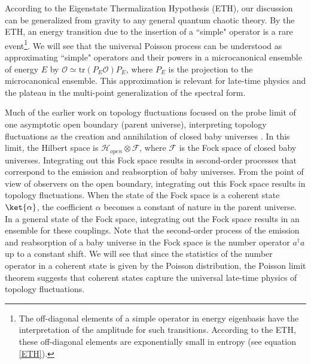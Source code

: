 \documentclass[a4paper,11pt]{article}
\theoremstyle{definition}
\numberwithin{equation}{section}
\newcommand{\mF}{\mathcal{F}}
\newcommand{\NL}[1]{\textcolor{blue}{#1}}
\newcommand{\mO}{\mathcal{O}}
\begin{document}
According to the Eigenstate Thermalization Hypothesis (ETH), our discussion can be generalized from gravity to any general quantum chaotic theory. By the ETH, an energy transition due to the insertion of a ``simple" operator is a rare event\footnote{The off-diagonal elements of a simple operator in energy eigenbasis have the interpretation of the amplitude for such transitions. According to the ETH, these off-diagonal elements are exponentially small in entropy (see equation \ref{ETH}).}. We will see that the universal Poisson process can be understood as approximating ``simple" operators and their powers in a microcanonical ensemble of energy $E$ by $\mO\simeq \text{tr}(P_E\mO) P_E$, where $P_E$ is the projection to the microcanonical ensemble. This approximation is relevant for late-time physics and the plateau in the multi-point generalization of the spectral form. 


Much of the earlier work on topology fluctuations focused on the probe limit of one asymptotic open boundary (parent universe), interpreting topology fluctuations as the creation and annihilation of closed baby universes \cite{giddings1988axion,giddings1988loss,coleman1988black}. In this limit,  the Hilbert space is $\mathcal{H}_{open}\otimes \mF$, where $\mF$ is the Fock space of closed baby universes. Integrating out this Fock space results in second-order processes that correspond to the emission and reabsorption of baby universes. From the point of view of observers on the open boundary, integrating out this Fock space results in topology fluctuations. When the state of the Fock space is a coherent state $\ket{\alpha}$, the coefficient $\alpha$ becomes a constant of nature in the parent universe. In a general state of the Fock space, integrating out the Fock space results in an ensemble for these couplings. Note that the second-order process of the emission and reabsorption of a baby universe in the Fock space is the number operator $a^\dagger a$ up to a constant shift. We will see that since the statistics of the number operator in a coherent state is given by the Poisson distribution, the Poisson limit theorem suggests that coherent states capture the universal late-time physics of topology fluctuations.

\end{document}
